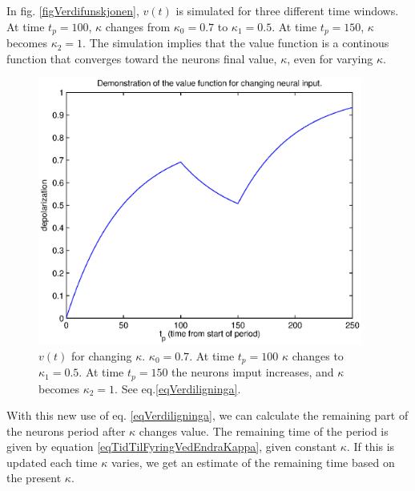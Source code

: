 In fig. \ref{figVerdifunskjonen}, $v(t)$ is simulated for three different time windows. At time $t_p=100$, $\kappa$ changes from $\kappa_0=0.7$ to $\kappa_1=0.5$. At time $t_p=150$, $\kappa$ becomes $\kappa_2=1$. 
The simulation implies that the value function is a continous function that converges toward the neurons final value, $\kappa$, even for varying $\kappa$.

\begin{figure}[b!htp]
	\label{figVerdifunksjonen}
	\begin{center}
		\includegraphics[width=0.95\textwidth]{demonstrasjonAvUlikeKappaforVerdifunksjonen.eps}
	\end{center}
	\caption{$v(t)$ for changing $\kappa$. $\kappa_0=0.7$. At time $t_p=100$ $\kappa$ changes to $\kappa_1=0.5$. At time $t_p=150$ the neurons imput increases, and $\kappa$ becomes $\kappa_2=1$. See eq.\eqref{eqVerdiligninga}.}
\end{figure}

With this new use of eq. \eqref{eqVerdiligninga}, we can calculate the remaining part of the neurons period after $\kappa$ changes value. 
The remaining time of the period is given by equation \eqref{eqTidTilFyringVedEndraKappa}, given constant $\kappa$. 
If this is updated each time $\kappa$ varies, we get an estimate of the remaining time based on the present $\kappa$.






